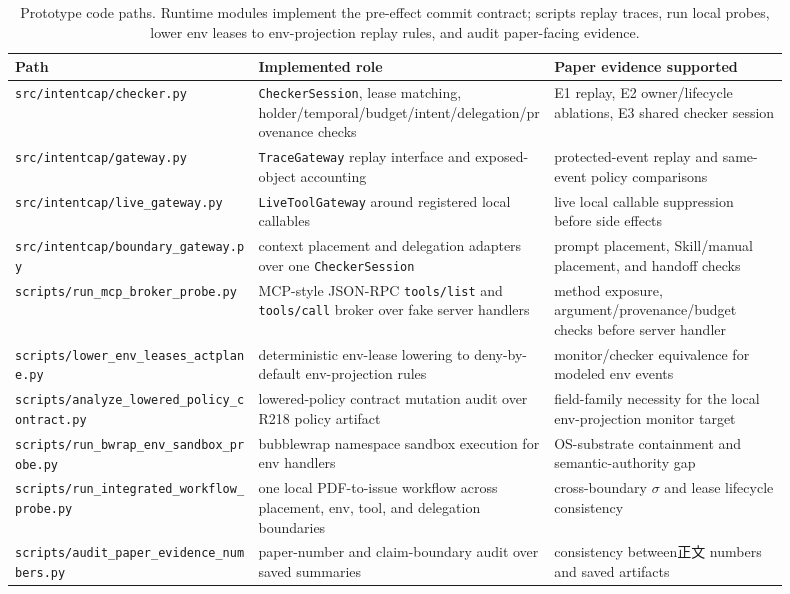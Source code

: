 \documentclass[UTF8,a4paper,11pt]{ctexart}
\begin{document}
\begin{table}[t]
\centering
\tiny
\setlength{\tabcolsep}{1.2pt}
\caption{Prototype code paths. Runtime modules implement the pre-effect commit contract; scripts replay traces, run local probes, lower env leases to env-projection replay rules, and audit paper-facing evidence.}
\label{tab:implementation-code-paths}
\begin{tabular}{p{0.29\linewidth}p{0.34\linewidth}p{0.27\linewidth}}
\toprule
Path & Implemented role & Paper evidence supported \\
\midrule
\texttt{src/intentcap/checker.py} & \texttt{CheckerSession}, lease matching, holder/temporal/budget/intent/delegation/provenance checks & E1 replay, E2 owner/lifecycle ablations, E3 shared checker session \\
\texttt{src/intentcap/gateway.py} & \texttt{TraceGateway} replay interface and exposed-object accounting & protected-event replay and same-event policy comparisons \\
\texttt{src/intentcap/live\_gateway.py} & \texttt{LiveToolGateway} around registered local callables & live local callable suppression before side effects \\
\texttt{src/intentcap/boundary\_gateway.py} & context placement and delegation adapters over one \texttt{CheckerSession} & prompt placement, Skill/manual placement, and handoff checks \\
\texttt{scripts/run\_mcp\_broker\_probe.py} & MCP-style JSON-RPC \texttt{tools/list} and \texttt{tools/call} broker over fake server handlers & method exposure, argument/provenance/budget checks before server handler \\
\texttt{scripts/lower\_env\_leases\_actplane.py} & deterministic env-lease lowering to deny-by-default env-projection rules & monitor/checker equivalence for modeled env events \\
\texttt{scripts/analyze\_lowered\_policy\_contract.py} & lowered-policy contract mutation audit over R218 policy artifact & field-family necessity for the local env-projection monitor target \\
\texttt{scripts/run\_bwrap\_env\_sandbox\_probe.py} & bubblewrap namespace sandbox execution for env handlers & OS-substrate containment and semantic-authority gap \\
\texttt{scripts/run\_integrated\_workflow\_probe.py} & one local PDF-to-issue workflow across placement, env, tool, and delegation boundaries & cross-boundary \(\sigma\) and lease lifecycle consistency \\
\texttt{scripts/audit\_paper\_evidence\_numbers.py} & paper-number and claim-boundary audit over saved summaries & consistency between正文 numbers and saved artifacts \\
\bottomrule
\end{tabular}
\end{table}
\end{document}
